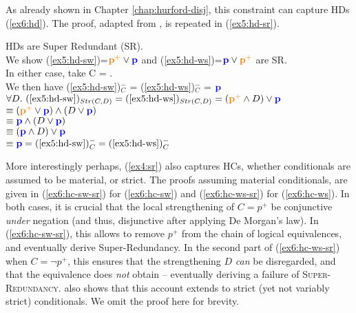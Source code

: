 As already shown in Chapter \ref{chap:hurford-disj}, this constraint can capture HDs (\ref{ex6:hd}). The proof, adapted from \textcite{Kalomoiros2024}, is repeated in (\ref{ex5:hd-sr}).

\begin{exe}
	 {HDs are Super Redundant (SR).\\
		We show (\ref{ex5:hd-sw})=$\textbf{\textcolor{orange}{p$^+$}}\vee\textbf{\textcolor{blue}{p}}$ and (\ref{ex5:hd-ws})=$\textbf{\textcolor{blue}{p}}\vee\textbf{\textcolor{orange}{p$^+$}}$ are SR.\\
		In either case, take C = \pplus.\\
		We then have (\ref{ex5:hd-sw})$^-_C$ = (\ref{ex5:hd-ws})$^-_C$ = $\textbf{\textcolor{blue}{p}}$\\
		$\forall D. \ (\textref{ex5:hd-sw})_{Str(C, D)} = (\textref{ex5:hd-ws})_{Str(C, D)} =  (\pplus \wedge D) \vee \p$\\
		 $\equiv (\textbf{\textcolor{orange}{p$^+$}} \vee \textbf{\textcolor{blue}{p}}) \wedge (D \vee \textbf{\textcolor{blue}{p}})$\\
		 $\equiv \textbf{\textcolor{blue}{p}} \wedge (D \vee \textbf{\textcolor{blue}{p}})$\\
		 $\equiv (\textbf{\textcolor{blue}{p}} \wedge D) \vee \textbf{\textcolor{blue}{p}}$\\
		 $\equiv \p = (\textref{ex5:hd-sw})^-_C = (\textref{ex5:hd-ws})^-_C$ 
	}
\end{exe}

More interestingly perhaps, (\ref{ex4:sr}) also captures HCs, whether conditionals are assumed to be material, or strict. The proofs assuming material conditionals, are given in (\ref{ex6:hc-sw-sr}) for (\ref{ex6:hc-sw}) and (\ref{ex6:hc-ws-sr}) for (\ref{ex6:hc-ws}). In both cases, it is crucial that the local strengthening of $C=p^+$ be conjunctive \textit{under} negation (and thus, disjunctive after applying De Morgan's law). In (\ref{ex6:hc-sw-sr}), this allows to remove $p^+$ from the chain of logical equivalences, and eventually derive Super-Redundancy. In the second part of (\ref{ex6:hc-ws-sr}) when $C=\neg p^+$, this ensures that the strengthening $D$ \textit{can} be disregarded, and that the equivalence does \textit{not} obtain -- eventually deriving a failure of \textsc{Super-Redundancy}. \textcite{Kalomoiros2024} also shows that this account extends to strict (yet not variably strict) conditionals. We omit the proof here for brevity.

